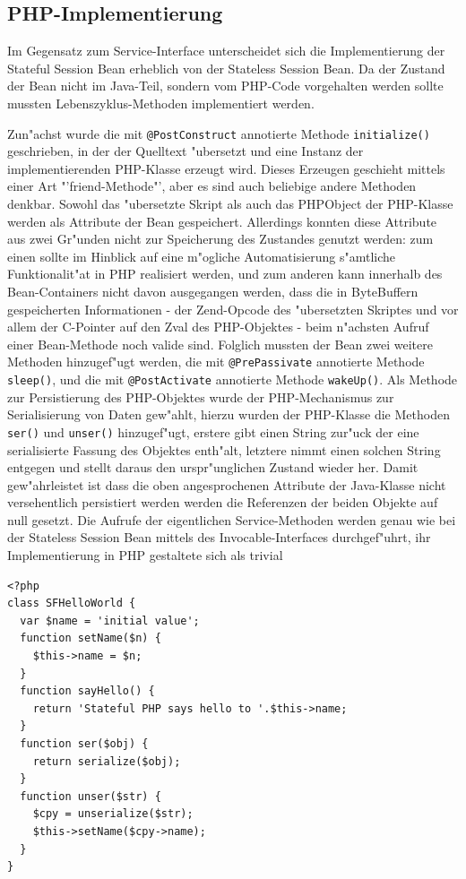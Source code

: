\subsection{PHP-Implementierung}
\label{sec:chap2:sfsb:impl}

Im Gegensatz zum Service-Interface unterscheidet sich die Implementierung der Stateful Session Bean erheblich von der
Stateless Session Bean. Da der Zustand der Bean nicht im Java-Teil, sondern vom PHP-Code vorgehalten werden sollte
mussten Lebenszyklus-Methoden implementiert werden.

Zun"achst wurde die mit \texttt{@PostConstruct} annotierte Methode \texttt{initialize()} geschrieben, in der der Quelltext
"ubersetzt und eine Instanz der implementierenden PHP-Klasse erzeugt wird. Dieses Erzeugen geschieht mittels einer
Art "'friend-Methode"', aber es sind auch beliebige andere Methoden denkbar.
Sowohl das "ubersetzte Skript als auch das PHPObject der PHP-Klasse werden als Attribute der Bean gespeichert. 
Allerdings konnten diese Attribute aus zwei
Gr"unden nicht zur Speicherung des Zustandes genutzt werden: zum einen sollte im Hinblick auf eine m"ogliche
Automatisierung s"amtliche Funktionalit"at in PHP realisiert werden, und zum anderen kann innerhalb des Bean-Containers
nicht davon ausgegangen werden, dass die in ByteBuffern gespeicherten Informationen - der Zend-Opcode des "ubersetzten
Skriptes und vor allem der C-Pointer auf den Zval des PHP-Objektes - beim n"achsten Aufruf einer Bean-Methode noch valide 
sind. Folglich mussten der Bean zwei weitere Methoden hinzugef"ugt werden, die mit \texttt{@PrePassivate} annotierte Methode
\texttt{sleep()}, und die mit \texttt{@PostActivate} annotierte Methode \texttt{wakeUp()}. Als Methode zur Persistierung des
PHP-Objektes wurde der PHP-Mechanismus zur Serialisierung von Daten gew"ahlt, hierzu wurden der PHP-Klasse die Methoden
\texttt{ser()} und \texttt{unser()} hinzugef"ugt, erstere gibt einen String zur"uck der eine serialisierte Fassung des Objektes
enth"alt, letztere nimmt einen solchen String entgegen und stellt daraus den urspr"unglichen Zustand wieder her.
Damit gew"ahrleistet ist dass die oben angesprochenen Attribute der Java-Klasse nicht versehentlich persistiert werden 
werden die Referenzen der beiden Objekte auf null gesetzt.
Die Aufrufe der eigentlichen Service-Methoden werden genau wie bei der Stateless Session Bean mittels des Invocable-Interfaces
durchgef"uhrt, ihr Implementierung in PHP gestaltete sich als trivial
\begin{lstlisting}[caption=PHP-Implementierung]
<?php
class SFHelloWorld {
  var $name = 'initial value';
  function setName($n) {
    $this->name = $n;
  }
  function sayHello() {
    return 'Stateful PHP says hello to '.$this->name;
  }
  function ser($obj) {
    return serialize($obj);
  }
  function unser($str) {
    $cpy = unserialize($str);
    $this->setName($cpy->name);
  }
}
\end{lstlisting}


